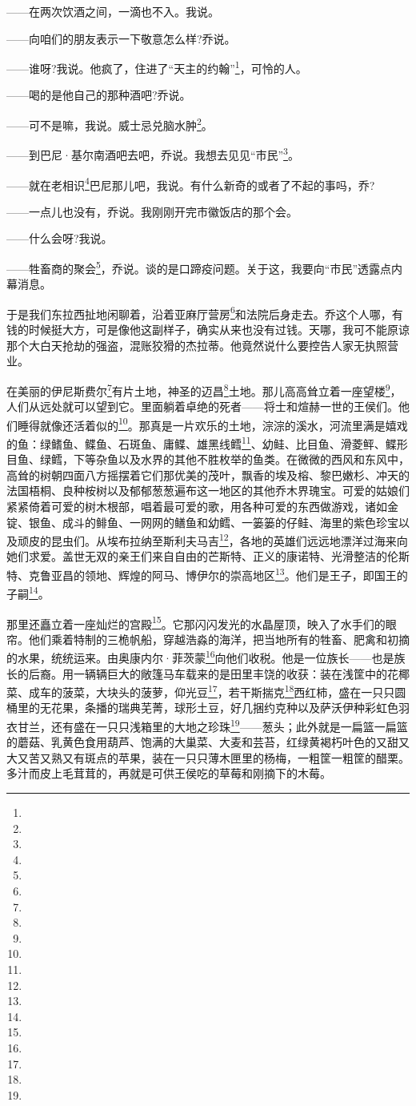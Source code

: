 \par ——在两次饮酒之间，一滴也不入。我说。
\par ——向咱们的朋友表示一下敬意怎么样?乔说。
\par ——谁呀?我说。他疯了，住进了“天主的约翰”\footnote{}，可怜的人。
\par ——喝的是他自己的那种酒吧?乔说。
\par ——可不是嘛，我说。威士忌兑脑水肿\footnote{}。
\par ——到巴尼·基尔南酒吧去吧，乔说。我想去见见“市民”\footnote{}。
\par ——就在老相识\footnote{}巴尼那儿吧，我说。有什么新奇的或者了不起的事吗，乔?
\par ——一点儿也没有，乔说。我刚刚开完市徽饭店的那个会。
\par ——什么会呀?我说。
\par ——牲畜商的聚会\footnote{}，乔说。谈的是口蹄疫问题。关于这，我要向“市民”透露点内幕消息。
\par 于是我们东拉西扯地闲聊着，沿着亚麻厅营房\footnote{}和法院后身走去。乔这个人哪，有钱的时候挺大方，可是像他这副样子，确实从来也没有过钱。天哪，我可不能原谅那个大白天抢劫的强盗，混账狡猾的杰拉蒂。他竟然说什么要控告人家无执照营业。
\par 在美丽的伊尼斯费尔\footnote{}有片土地，神圣的迈昌\footnote{}土地。那儿高高耸立着一座望楼\footnote{}，人们从远处就可以望到它。里面躺着卓绝的死者——将士和煊赫一世的王侯们。他们睡得就像还活着似的\footnote{}。那真是一片欢乐的土地，淙淙的溪水，河流里满是嬉戏的鱼：绿鳍鱼、鲽鱼、石斑鱼、庸鲽、雄黑线鳕\footnote{}、幼鲑、比目鱼、滑菱鲆、鲽形目鱼、绿鳕，下等杂鱼以及水界的其他不胜枚举的鱼类。在微微的西风和东风中，高耸的树朝四面八方摇摆着它们那优美的茂叶，飘香的埃及榕、黎巴嫩杉、冲天的法国梧桐、良种桉树以及郁郁葱葱遍布这一地区的其他乔木界瑰宝。可爱的姑娘们紧紧倚着可爱的树木根部，唱着最可爱的歌，用各种可爱的东西做游戏，诸如金锭、银鱼、成斗的鲱鱼、一网网的鳝鱼和幼鳕、一篓篓的仔鲑、海里的紫色珍宝以及顽皮的昆虫们。从埃布拉纳至斯利夫马吉\footnote{}，各地的英雄们远远地漂洋过海来向她们求爱。盖世无双的亲王们来自自由的芒斯特、正义的康诺特、光滑整洁的伦斯特、克鲁亚昌的领地、辉煌的阿马、博伊尔的崇高地区\footnote{}。他们是王子，即国王的子嗣\footnote{}。
\par 那里还矗立着一座灿烂的宫殿\footnote{}。它那闪闪发光的水晶屋顶，映入了水手们的眼帘。他们乘着特制的三桅帆船，穿越浩淼的海洋，把当地所有的牲畜、肥禽和初摘的水果，统统运来。由奥康内尔·菲茨蒙\footnote{}向他们收税。他是一位族长——也是族长的后裔。用一辆辆巨大的敞篷马车载来的是田里丰饶的收获：装在浅筐中的花椰菜、成车的菠菜，大块头的菠萝，仰光豆\footnote{}，若干斯揣克\footnote{}西红柿，盛在一只只圆桶里的无花果，条播的瑞典芜菁，球形土豆，好几捆约克种以及萨沃伊种彩虹色羽衣甘兰，还有盛在一只只浅箱里的大地之珍珠\footnote{}——葱头；此外就是一扁篮一扁篮的蘑菇、乳黄色食用葫芦、饱满的大巢菜、大麦和芸苔，红绿黄褐朽叶色的又甜又大又苦又熟又有斑点的苹果，装在一只只薄木匣里的杨梅，一粗筐一粗筐的醋栗。多汁而皮上毛茸茸的，再就是可供王侯吃的草莓和刚摘下的木莓。

